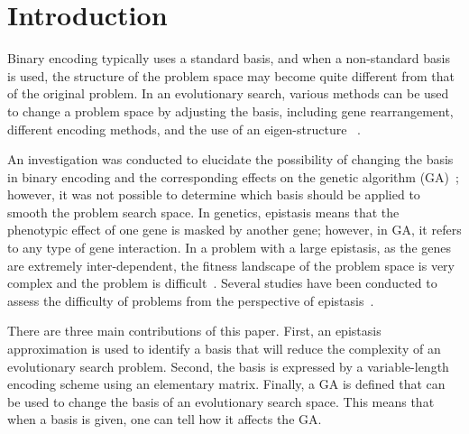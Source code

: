 \section{Introduction}
Binary encoding typically uses a standard basis, and when a non-standard basis is used, the structure of the problem space may become quite different from that of the original problem. In an evolutionary search, various methods can be used to change a problem space by adjusting the basis, including gene rearrangement, different encoding methods, and the use of an eigen-structure ~\cite{hwang2006multi, CHANG20091210, sankoff1998multiple, raidl2000weighted, falkenauer1994new, gen2006genetic, wang2009genetic, lotfi2013genetic, pernkopf2001feature, wang2006new, wu2012novel, wyatt2003finding}.

An investigation was conducted to elucidate the possibility of changing the basis in binary encoding and the corresponding effects on the genetic algorithm (GA)~\cite{kim2008effect}; however, it was not possible to determine which basis should be applied to smooth the problem search space. In genetics, epistasis means that the phenotypic effect of one gene is masked by another gene; however, in GA, it refers to any type of gene interaction. In a problem with a large epistasis, as the genes are extremely inter-dependent, the fitness landscape of the problem space is very complex and the problem is difficult~\cite{davidor1990epistasis}. Several studies have been conducted to assess the difficulty of problems from the perspective of epistasis~\cite{seo2003new, seo2004new, ventresca2007epistasis, seo2005computing, reeves1995epistasis, naudts2000comparison, beasley1993reducing}.

There are three main contributions of this paper. First, an epistasis approximation is used to identify a basis that will reduce the complexity of an evolutionary search problem. Second, the basis is expressed by a variable-length encoding scheme using an elementary matrix. Finally, a GA is defined that can be used to change the basis of an evolutionary search space. This means that when a basis is given, one can tell how it affects the GA.

